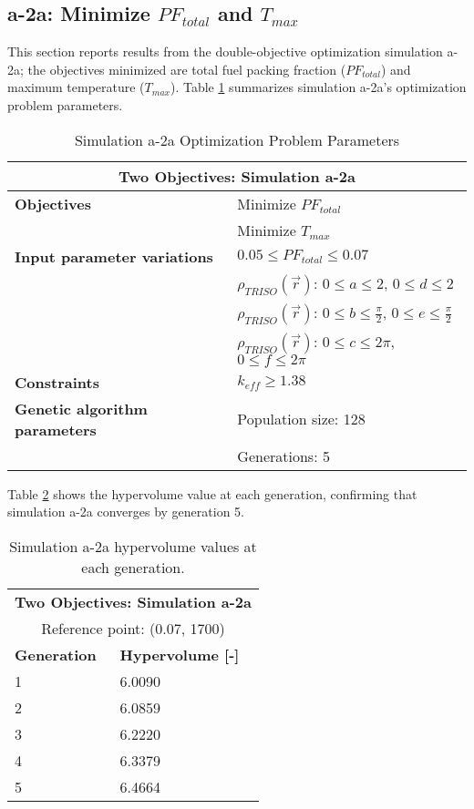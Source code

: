 \subsection{a-2a: Minimize $PF_{total}$ and $T_{max}$}
\label{sec:a-2a}
This section reports results from the double-objective optimization simulation a-2a; the 
objectives minimized are total fuel packing fraction ($PF_{total}$) and maximum
temperature ($T_{max}$).  
Table \ref{tab:simulationa2a} summarizes simulation a-2a's optimization problem parameters. 
\begin{table}[htbp!]
    \centering
    \onehalfspacing
    \caption{Simulation a-2a Optimization Problem Parameters}
	\label{tab:simulationa2a}
    \footnotesize
    \begin{tabular}{l|p{5.3cm}}
    \hline 
    \multicolumn{2}{c}{\textbf{Two Objectives: Simulation a-2a}} \\
    \hline 
    \textbf{Objectives} & Minimize $PF_{total}$ \\
    & Minimize $T_{max}$ \\
    \hline 
    \textbf{Input parameter variations} & $0.05 \leq PF_{total} \leq 0.07$ \\
    & $\rho_{TRISO}(\vec{r})$: $0 \leq a \leq 2$, $0 \leq d \leq 2$\\
    & $\rho_{TRISO}(\vec{r})$: $0 \leq b \leq \frac{\pi}{2}$, $0 \leq e \leq \frac{\pi}{2}$\\
    & $\rho_{TRISO}(\vec{r})$: $0 \leq c \leq 2\pi$, $0 \leq f \leq 2\pi$\\
    \hline
    \textbf{Constraints} & $k_{eff} \geq 1.38$\\ 
    \hline 
    \textbf{Genetic algorithm parameters} & Population size: 128 \\
    & Generations: 5 \\
    \hline
    \end{tabular}
\end{table}
Table \ref{tab:a2a-hypervolume} shows the hypervolume value at each generation, 
confirming that simulation a-2a converges by generation 5. 
\begin{table}[htbp!]
    \centering
    \onehalfspacing
    \caption{Simulation a-2a hypervolume values at each generation.}
	\label{tab:a2a-hypervolume}
    \footnotesize
    \begin{tabular}{ll}
    \hline 
    \multicolumn{2}{c}{\textbf{Two Objectives: Simulation a-2a}} \\
    \multicolumn{2}{c}{Reference point: (0.07, 1700)} \\
    \hline 
    \textbf{Generation} & \textbf{Hypervolume [-]} \\
    \hline
    1 & 6.0090 \\
    2 & 6.0859 \\
    3 & 6.2220 \\
    4 & 6.3379 \\
    5 & 6.4664 \\
    \hline
    \end{tabular}
\end{table}

